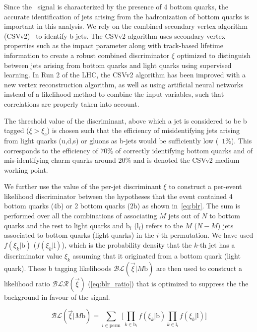 Since the \ttHbb~signal is characterized by the presence of 4 bottom quarks, the accurate identification of jets arising from the hadronization of bottom quarks is important in this analysis. We rely on the combined secondary vertex algorithm (CSVv2)~\cite{Chatrchyan:2012jua} to identify b jets. The CSVv2 algorithm uses secondary vertex properties such as the impact parameter along with track-based lifetime information to create a robust combined discriminator $\xi$ optimized to distinguish between jets arising from bottom quarks and light quarks using supervised learning. In Run 2 of the LHC, the CSVv2 algorithm has been improved with a new vertex reconstruction algorithm, as well as using artificial neural networks instead of a likelihood method to combine the input variables, such that correlations are properly taken into account\cite{CMS-PAS-BTV-15-001}.

The threshold value of the discriminant, above which a jet is considered to be b tagged ($\xi > \xi_c$) is chosen such that the efficiency of misidentifying jets arising from light quarks (u,d,s) or gluons as b-jets would be sufficiently low (~$1\%$). This corresponds to the efficiency of $70\%$ of correctly identifying bottom quarks and of mis-identifying charm quarks around $20\%$ and is denoted the CSVv2 medium working point.

We further use the value of the per-jet discriminant $\xi$ to construct a per-event likelihood discriminator between the hypotheses that the event contained 4 bottom quarks ($4\mathrm{b}$) or 2 bottom quarks ($2\mathrm{b}$) as shown in~\cref{eq:blr}. The sum is performed over all the combinations of associating $M$ jets out of $N$ to bottom quarks and the rest to light quarks and $\mathrm{b}_i$ ($\mathrm{l}_i$) refers to the $M$ ($N-M$) jets associated to bottom quarks (light quarks) in the $i$-th permutation. We have used $f(\xi_k | \mathrm{b})$ ($f(\xi_k | \mathrm{l})$), which is the probability density that the $k$-th jet has a discriminator value $\xi_k$ assuming that it originated from a bottom quark (light quark). These b tagging likelihoods $\mathcal{BL}(\vec{\xi} | M\mathrm{b})$ are then used to construct a likelihood ratio $\mathcal{BLR}(\vec{\xi})$ (\cref{eq:blr_ratio}) that is optimized to suppress the the \ttlf background in favour of the \ttHbb signal.

\begin{equation}
\label{eq:blr}
\mathcal{BL}(\vec{\xi} | M\mathrm{b}) = \sum_{i \in \mathrm{perm}} \biggl[ \prod_{k \in \mathrm{b}_i} f(\xi_k | \mathrm{b}) \prod_{k \in \mathrm{l}_i} f(\xi_k | \mathrm{l}) \biggr]
\end{equation}

